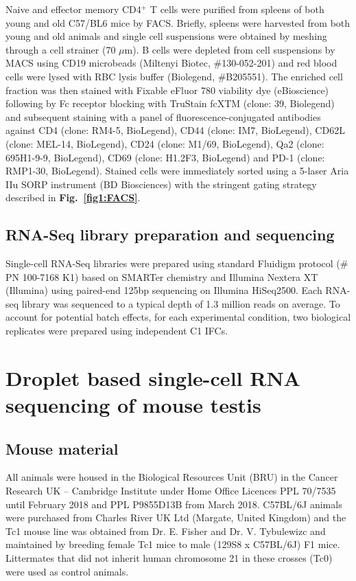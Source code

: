 Naive and effector memory CD4$^+$ T cells were purified from spleens of both young and old C57/BL6 mice by FACS.  Briefly, spleens were harvested from both young and old animals and single cell suspensions were obtained by meshing through a cell strainer (70 $\mu$m). B cells were depleted from cell suspensions by MACS using CD19 microbeads (Miltenyi Biotec, \#{}130-052-201) and red blood cells were lysed with RBC lysis buffer (Biolegend, \#{}B205551). The enriched cell fraction was then stained with Fixable eFluor 780 viability dye (eBioscience) following by Fc receptor blocking with TruStain fcXTM (clone: 39, Biolegend) and subsequent staining with a panel of fluorescence-conjugated antibodies against CD4 (clone: RM4-5, BioLegend), CD44 (clone: IM7, BioLegend), CD62L (clone: MEL-14, BioLegend), CD24 (clone: M1/69, BioLegend), Qa2 (clone: 695H1-9-9, BioLegend), CD69 (clone: H1.2F3, BioLegend) and PD-1 (clone: RMP1-30, BioLegend).  Stained cells were immediately sorted using a 5-laser Aria IIu SORP instrument (BD Biosciences) with the stringent gating strategy described in \textbf{Fig.~\ref{fig1:FACS}}. 

\subsection{RNA-Seq library preparation and sequencing}
\label{appA.1:RNA-Seq}

Single-cell RNA-Seq libraries were prepared using standard Fluidigm protocol (\# PN 100-7168 K1) based on SMARTer chemistry and Illumina Nextera XT (Illumina) using paired-end 125bp sequencing on Illumina HiSeq2500. Each RNA-seq library was sequenced to a typical depth of 1.3 million reads on average. To account for potential batch effects, for each experimental condition, two biological replicates were prepared using independent C1 IFCs.

\newpage

\section{Droplet based single-cell RNA sequencing of mouse testis}
\label{appA.2}

\subsection{Mouse material}

All animals were housed in the Biological Resources Unit (BRU) in the Cancer Research UK – Cambridge Institute under Home Office Licences PPL 70/7535 until February 2018 and PPL P9855D13B from March 2018. C57BL/6J animals were purchased from Charles River UK Ltd (Margate, United Kingdom) and the Tc1 mouse line was obtained from Dr. E. Fisher and Dr. V. Tybulewizc \citep{ODoherty2005} and maintained by breeding female Tc1 mice to male (129S8 x C57BL/6J) F1 mice. Littermates that did not inherit human chromosome 21 in these crosses (Tc0) were used as control animals.
 
